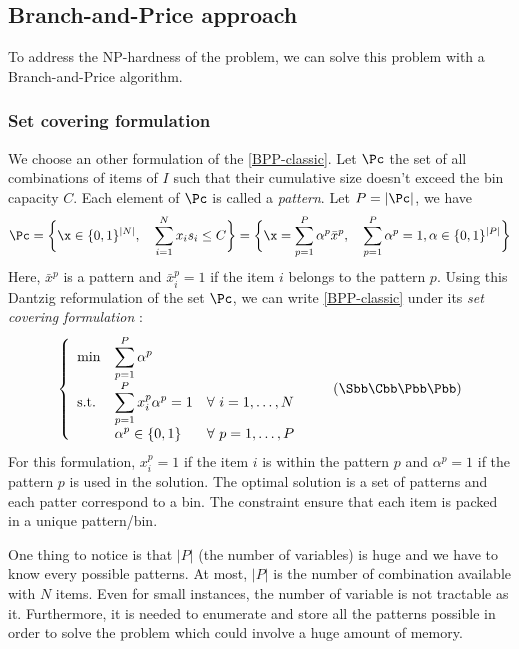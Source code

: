 \subsection{Branch-and-Price approach }

To address the NP-hardness of the problem, we can solve this problem with a Branch-and-Price algorithm.

\subsubsection{Set covering formulation}

We choose an other formulation of the \eqref{BPP-classic}. Let $\Pc$ the set of all combinations of items of $I$ such that their cumulative size doesn't exceed the bin capacity $C$. Each element of $\Pc$ is called a \textit{pattern}. Let $P=|\Pc|$, we have
\begin{equation*}
	\Pc = \bigg \{ \x \in \{0,1\}^{|N|}, \quad \sum_{i=1}^N x_i s_i \leq C \bigg \} = \bigg \{ \x = \sum_{p=1}^P \alpha^p \bar{x}^p, \quad \sum_{p=1}^P \alpha^p = 1, \alpha \in \{0,1\}^{|P|}  \bigg \}
\end{equation*}
Here, $\bar{x}^p$ is a pattern and $\bar{x}^p_i=1$ if the item $i$ belongs to the pattern $p$. Using this Dantzig reformulation of the set $\Pc$, we can write \eqref{BPP-classic} under its \textit{set covering formulation} :
\begin{equation}
	\label{SCBPP}
		\left \{
		\begin{array}{*5{>{\displaystyle}l}}
		\min & \sum_{p=1}^P \alpha^p \\
		\st & \sum_{p=1}^P x_i^p\alpha^p = 1 & \forall \ i = 1,\dots,N \\
		& \alpha^{p} \in \{0,1\} &  \forall \ p = 1,\dots,P
		\end{array}
		\right.
	\tag{$\Sbb\Cbb\Bbb\Pbb\Pbb$}
\end{equation}
For this formulation, $x_i^p=1$ if the item $i$ is within the pattern $p$ and $\alpha^p=1$ if the pattern $p$ is used in the solution. The optimal solution is a set of patterns and each patter correspond to a bin. The constraint ensure that each item is packed in a unique pattern/bin.

One thing to notice is that $|P|$ (the number of variables) is huge and we have to know every possible patterns. At most, $|P|$ is the number of combination available with $N$ items. Even for small instances, the number of variable is not tractable as it. Furthermore, it is needed to enumerate and store all the patterns possible in order to solve the problem which could involve a huge amount of memory. 

